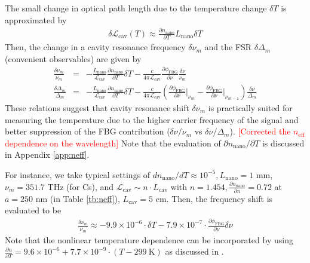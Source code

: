 \documentclass[aps,pra, onecolumn,superscriptaddress,nopacs,floatfix, showkeys, notitlepage]{revtex4-1}
\begin{document}
The small change in optical path length due to the temperature change $\delta T$ is approximated by
\begin{eqnarray}
        \delta \mathcal{L}_\mathrm{cav}(T)\approx \frac{\partial n_\mathrm{nano}}{\partial T} L_\mathrm{nano}\delta T 
\end{eqnarray}
Then, the change in a cavity resonance frequency $\delta \nu_m$ and the FSR $\delta \Delta_m$ (convenient observables) are given by 
\begin{eqnarray}
    \frac{\delta \nu_m}{\nu_m} &=&-\frac{L_\mathrm{nano}}{\mathcal{L}_\mathrm{cav}}\frac{\partial n_\mathrm{nano}}{\partial T}\delta T-\frac{c}{4\pi \mathcal{L}_\mathrm{cav}} \frac{\partial \phi_\mathrm{FBG}}{\partial \nu}\frac{\delta\nu}{\nu_m}
    \label{eq:df}
\\
    \frac{\delta\Delta_m}{\Delta_m} &=&-\frac{L_\mathrm{nano}}{\mathcal{L}_\mathrm{cav}}\frac{\partial n_\mathrm{nano}}{\partial T}\delta T-\frac{c}{4\pi \mathcal{L}_\mathrm{cav}} \left(\frac{\partial \phi_\mathrm{FBG}}{\partial \nu}\Big|_{\nu_{m}}-\frac{\partial \phi_\mathrm{FBG}}{\partial \nu}\Big|_{\nu_{m-1}}
    \right)\frac{\delta \nu}{\Delta_m}
\end{eqnarray}
These relations suggest that cavity resonance shift $\delta\nu_m$ is practically suited for measuring the temperature due to the higher carrier frequency of the signal and better suppression of the FBG contribution ($\delta\nu/\nu_m$ vs $\delta\nu/\Delta_m$).  
\textcolor{red}{[Corrected the $n_\mathrm{eff}$ dependence on the wavelength]} Note that the evaluation of $\partial n_\mathrm{nano}/\partial T$ is discussed in Appendix \ref{app:neff}.

For instance, we take typical settings of $dn_\mathrm{nano}/dT\approx 10^{-5}, L_\mathrm{nano}=1$ mm, $\nu_m= 351.7
$ THz (for Cs), and $ \mathcal{L}_\mathrm{cav}\sim n\cdot L_\mathrm{cav}$ with $n=1.454, \frac{\partial n_\mathrm{nano}}{\partial n}=0.72$ at $a=250$ nm (in Table \ref{tb:neff}), $L_\mathrm{cav}=5$ cm.
Then, the frequency shift is evaluated to be 
\begin{eqnarray}
    \frac{\delta \nu_m}{\nu_m} 
    \approx-9.9\times 10^{-6} \cdot\delta T-7.9\times 10^{-7}\cdot\frac{\partial \phi_\mathrm{FBG}}{\partial \nu}\delta \nu
    \label{eq:df_num}
\end{eqnarray}
Note that the nonlinear temperature dependence can be incorporated by using $\frac{\partial n}{\partial T}=9.6\times 10^{-6}+7.7\times 10^{-9}\cdot (T-299~\mathrm{K})$ as discussed in \cite{Wuttke2013, Wuttke_thesis}.
\end{document}
